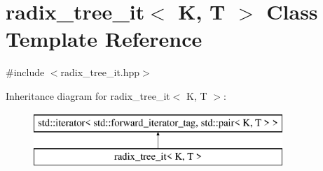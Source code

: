 \hypertarget{classradix__tree__it}{}\section{radix\+\_\+tree\+\_\+it$<$ K, T $>$ Class Template Reference}
\label{classradix__tree__it}


{\ttfamily \#include $<$radix\+\_\+tree\+\_\+it.\+hpp$>$}

Inheritance diagram for radix\+\_\+tree\+\_\+it$<$ K, T $>$\+:\begin{figure}[H]
\begin{center}
\leavevmode
\includegraphics[height=2.000000cm]{classradix__tree__it}
\end{center}
\end{figure}
